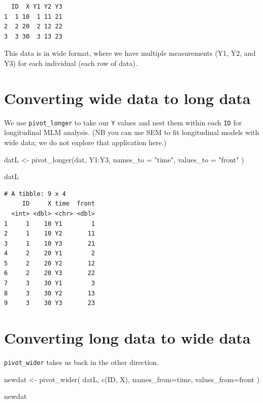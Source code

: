 \documentclass[
  letterpaper,
  DIV=11,
  numbers=noendperiod]{scrreprt}
\newenvironment{Shaded}{}{}
\newcommand{\AttributeTok}[1]{\textcolor[rgb]{0.49,0.56,0.16}{#1}}
\newcommand{\FunctionTok}[1]{\textcolor[rgb]{0.02,0.16,0.49}{#1}}
\newcommand{\NormalTok}[1]{#1}
\newcommand{\OtherTok}[1]{\textcolor[rgb]{0.00,0.44,0.13}{#1}}
\newcommand{\SpecialCharTok}[1]{\textcolor[rgb]{0.25,0.44,0.63}{#1}}
\newcommand{\StringTok}[1]{\textcolor[rgb]{0.25,0.44,0.63}{#1}}
\begin{document}
\begin{verbatim}
  ID  X Y1 Y2 Y3
1  1 10  1 11 21
2  2 20  2 12 22
3  3 30  3 13 23
\end{verbatim}

This data is in wide format, where we have multiple measurements (Y1,
Y2, and Y3) for each individual (each row of data).

\section{Converting wide data to long
data}\label{converting-wide-data-to-long-data}

We use \texttt{pivot\_longer} to take our \texttt{Y} values and nest
them within each \texttt{ID} for longitudinal MLM analysis. (NB you can
use SEM to fit longitudinal models with wide data; we do not explore
that application here.)

\begin{Shaded}
\begin{Highlighting}[]
\NormalTok{datL }\OtherTok{\textless{}{-}} \FunctionTok{pivot\_longer}\NormalTok{(dat, Y1}\SpecialCharTok{:}\NormalTok{Y3, }
                     \AttributeTok{names\_to =} \StringTok{"time"}\NormalTok{, }
                     \AttributeTok{values\_to =} \StringTok{"front"}\NormalTok{ )}

\NormalTok{datL}
\end{Highlighting}
\end{Shaded}

\begin{verbatim}
# A tibble: 9 x 4
     ID     X time  front
  <int> <dbl> <chr> <dbl>
1     1    10 Y1        1
2     1    10 Y2       11
3     1    10 Y3       21
4     2    20 Y1        2
5     2    20 Y2       12
6     2    20 Y3       22
7     3    30 Y1        3
8     3    30 Y2       13
9     3    30 Y3       23
\end{verbatim}

\section{Converting long data to wide
data}\label{converting-long-data-to-wide-data}

\texttt{pivot\_wider} takes us back in the other direction.

\begin{Shaded}
\begin{Highlighting}[]
\NormalTok{newdat }\OtherTok{\textless{}{-}} \FunctionTok{pivot\_wider}\NormalTok{( datL, }\FunctionTok{c}\NormalTok{(ID, X), }
                       \AttributeTok{names\_from=}\NormalTok{time, }
                       \AttributeTok{values\_from=}\NormalTok{front  )}

\NormalTok{newdat}
\end{Highlighting}
\end{Shaded}
\end{document}
